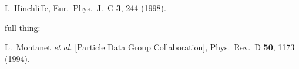 I.~Hinchliffe,
Eur.\ Phys.\ J.\ C {\bf 3}, 244 (1998).


full thing:

L.~Montanet {\it et al.}  [Particle Data Group Collaboration],
Phys.\ Rev.\ D {\bf 50}, 1173 (1994).
